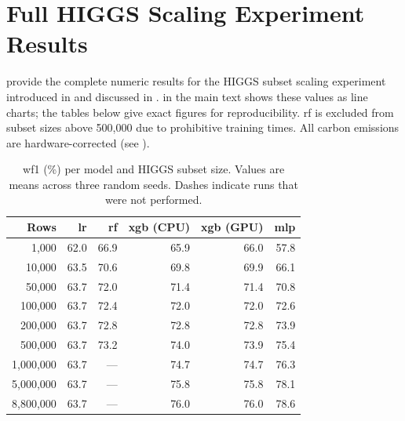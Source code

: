 \let\cleardoublepage\clearpage
\appendix
{}


\chapter{Full HIGGS Scaling Experiment Results}
\label{app:scaling}

 provide the complete numeric results for the HIGGS subset scaling experiment introduced in  and discussed in .  in the main text shows these values as line charts; the tables below give exact figures for reproducibility. \gls{rf} is excluded from subset sizes above 500{,}000 due to prohibitive training times. All carbon emissions are hardware-corrected (see ).

\begin{table}[htbp]
\centering
\caption[\acrshort{wf1} per model across HIGGS subset sizes.]{\acrshort{wf1} (\%) per model and HIGGS subset size. Values are means across three random seeds. Dashes indicate runs that were not performed.}
\label{tab:app_scaling_wf1}
\begin{tabular}{@{} r rrrrr @{}}
\toprule
\textbf{Rows} & \textbf{\gls{lr}} & \textbf{\gls{rf}} & \textbf{\gls{xgb} (CPU)} & \textbf{\gls{xgb} (GPU)} & \textbf{\gls{mlp}} \\
\midrule
1{,}000       & 62.0 & 66.9 & 65.9 & 66.0 & 57.8 \\
10{,}000      & 63.5 & 70.6 & 69.8 & 69.9 & 66.1 \\
50{,}000      & 63.7 & 72.0 & 71.4 & 71.4 & 70.8 \\
100{,}000     & 63.7 & 72.4 & 72.0 & 72.0 & 72.6 \\
200{,}000     & 63.7 & 72.8 & 72.8 & 72.8 & 73.9 \\
500{,}000     & 63.7 & 73.2 & 74.0 & 73.9 & 75.4 \\
1{,}000{,}000 & 63.7 & ---   & 74.7 & 74.7 & 76.3 \\
5{,}000{,}000 & 63.7 & ---   & 75.8 & 75.8 & 78.1 \\
8{,}800{,}000 & 63.7 & ---   & 76.0 & 76.0 & 78.6 \\
\bottomrule
\end{tabular}
\end{table}

